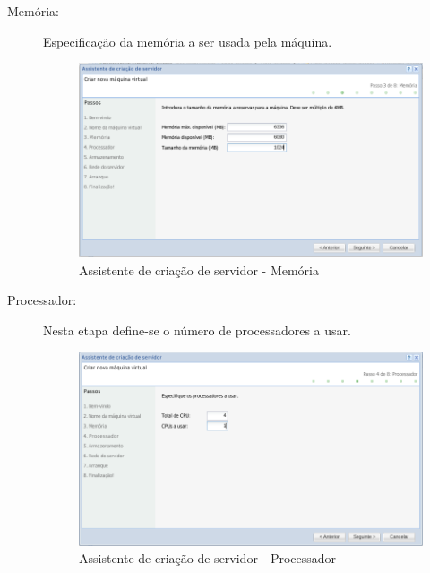 \begin{description}
	\item[Memória:] Especificação da memória a ser usada pela máquina.
		\begin{figure}[H]
        		\begin{center}
		        \includegraphics[scale=0.5]{screenshots/server_createwiz_memory.png}
        		\caption{Assistente de criação de servidor - Memória}
	        	\label{fig:server_createwiz_memory}
	        	\end{center}
		\end{figure}

	\item[Processador:] Nesta etapa define-se o número de processadores a usar.
		\begin{figure}[H]
        		\begin{center}
		        \includegraphics[scale=0.5]{screenshots/server_createwiz_processor.png}
        		\caption{Assistente de criação de servidor - Processador}
		        \label{fig:server_createwiz_processor}
	        	\end{center}
		\end{figure}


\end{description}
